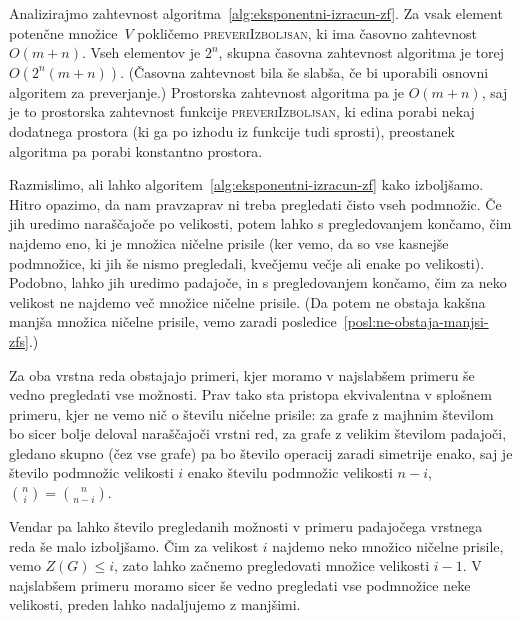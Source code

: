 \documentclass[12pt,a4paper,twoside]{article}
\theoremstyle{definition} %
\theoremstyle{plain} %
\numberwithin{equation}{section}  %
\begin{document}
Analizirajmo zahtevnost algoritma~\ref{alg:eksponentni-izracun-zf}. Za vsak element potenčne množice~$V$ pokličemo \textsc{preveriIzboljsan}, ki ima časovno zahtevnost $O(m+n)$. Vseh elementov je $2^n$, skupna časovna zahtevnost algoritma je torej $O(2^n(m+n))$. (Časovna zahtevnost bila še slabša, če bi uporabili osnovni algoritem za preverjanje.)
Prostorska zahtevnost algoritma pa je $O(m+n)$, saj je to prostorska zahtevnost funkcije  \textsc{preveriIzboljsan}, ki edina porabi nekaj dodatnega prostora (ki ga po izhodu iz funkcije tudi sprosti), preostanek algoritma pa porabi konstantno prostora.

Razmislimo, ali lahko algoritem~\ref{alg:eksponentni-izracun-zf} kako izboljšamo. Hitro opazimo, da nam pravzaprav ni treba pregledati čisto vseh podmnožic. Če jih uredimo naraščajoče po velikosti, potem lahko s pregledovanjem končamo, čim najdemo eno, ki je množica ničelne prisile (ker vemo, da so vse kasnejše podmnožice, ki jih še nismo pregledali, kvečjemu večje ali enake po velikosti). Podobno, lahko jih uredimo padajoče, in s pregledovanjem končamo, čim za neko velikost ne najdemo več množice ničelne prisile. (Da potem ne obstaja kakšna manjša množica ničelne prisile, vemo zaradi posledice~\ref{posl:ne-obstaja-manjsi-zfs}.)

Za oba vrstna reda obstajajo primeri, kjer moramo v najslabšem primeru še vedno pregledati vse možnosti. Prav tako sta pristopa ekvivalentna v splošnem primeru, kjer ne vemo nič o številu ničelne prisile: za grafe z majhnim številom bo sicer bolje deloval naraščajoči vrstni red, za grafe z velikim številom padajoči, gledano skupno (čez vse grafe) pa bo število operacij zaradi simetrije enako, saj je število podmnožic velikosti $i$ enako številu podmnožic velikosti $n-i$, $\binom{n}{i} = \binom{n}{n-i}$.

Vendar pa lahko število pregledanih možnosti v primeru padajočega vrstnega reda še malo izboljšamo. Čim za velikost $i$ najdemo neko množico ničelne prisile, vemo $Z(G) \leq i$, zato lahko začnemo pregledovati množice velikosti $i-1$. V najslabšem primeru moramo sicer še vedno pregledati vse podmnožice neke velikosti, preden lahko nadaljujemo z manjšimi.
\end{document}
